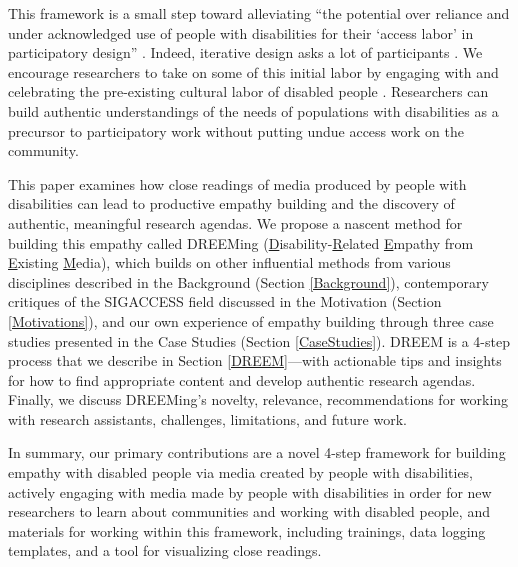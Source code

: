 This framework is a small step toward alleviating ``the potential over reliance and under acknowledged use of people with disabilities for their `access labor' in participatory design'' \cite{mackWhatWeMean2021,bennettBiographicalPrototypesReimagining2019}. Indeed, iterative design asks a lot of participants \cite{dourishBeingIteratedAffective2020}.
We encourage researchers to take on some of this initial labor by engaging with and celebrating the pre-existing cultural labor of disabled people \cite{piepzna-samarasinhaCareWorkDreaming2018}. Researchers can build authentic understandings of the needs of populations with disabilities as a precursor to participatory work without putting undue access work on the community.  

This paper examines how close readings of media produced by people with disabilities can lead to productive empathy building and the discovery of authentic, meaningful research agendas. We propose a nascent method for building this empathy called DREEMing (\underline{D}isability-\underline{R}elated \underline{E}mpathy from \underline{E}xisting \underline{M}edia), which builds on other influential methods from various disciplines described in the Background (Section \ref{Background}), contemporary critiques of the SIGACCESS field discussed in the Motivation (Section \ref{Motivations}), and our own experience of empathy building through three case studies presented in the Case Studies (Section \ref{CaseStudies}). DREEM is a 4-step process that we describe in Section \ref{DREEM}—with actionable tips and insights for how to find appropriate content and develop authentic research agendas. Finally, we discuss DREEMing's novelty, relevance, recommendations for working with research assistants, challenges, limitations, and future work.

In summary, our primary contributions are a novel 4-step framework for building empathy with disabled people via media created by people with disabilities, actively engaging with media made by people with disabilities in order for new researchers to learn about communities and working with disabled people, and materials for working within this framework, including trainings, data logging templates, and a tool for visualizing close readings.

